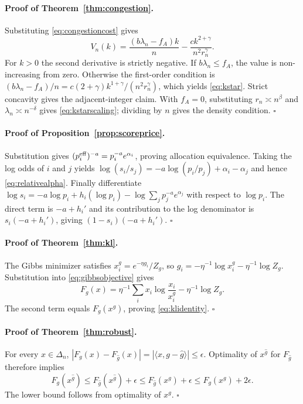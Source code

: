 \documentclass[sigconf,nonacm]{acmart}
\newcommand{\1}{\mathbf 1}
\begin{document}
\paragraph{Proof of Theorem~\ref{thm:congestion}.}
Substituting \eqref{eq:congestioncost} gives
\[
V_n(k)=\frac{(b\lambda_n-f_A)k}{n}
-\frac{c k^{2+\gamma}}{n^2r_n^\gamma}.
\]
For $k>0$ the second derivative is strictly negative.  If
$b\lambda_n\le f_A$, the value is non-increasing from zero.  Otherwise the
first-order condition is
$(b\lambda_n-f_A)/n=c(2+\gamma)k^{1+\gamma}/(n^2r_n^\gamma)$,
which yields \eqref{eq:kstar}.  Strict concavity gives the adjacent-integer
claim.  With $f_A=0$, substituting $r_n\asymp n^\beta$ and
$\lambda_n\asymp n^{-\delta}$ gives \eqref{eq:kstarscaling}; dividing by $n$
gives the density condition.
\hfill$\square$

\paragraph{Proof of Proposition~\ref{prop:scoreprice}.}
Substitution gives
$(p_i^{\rm eff})^{-a}=p_i^{-a}e^{\alpha_i}$, proving allocation
equivalence.  Taking the log odds of $i$ and $j$ yields
$\log(s_i/s_j)=-a\log(p_i/p_j)+\alpha_i-\alpha_j$ and hence
\eqref{eq:relativealpha}.  Finally differentiate
$\log s_i=-a\log p_i+h_i(\log p_i)-\log\sum_jp_j^{-a}e^{\alpha_j}$
with respect to $\log p_i$.  The direct term is $-a+h_i'$ and its contribution
to the log denominator is $s_i(-a+h_i')$, giving
$(1-s_i)(-a+h_i')$. \hfill$\square$

\paragraph{Proof of Theorem~\ref{thm:kl}.}
The Gibbs minimizer satisfies $x_i^g=e^{-\eta g_i}/Z_g$, so
$g_i=-\eta^{-1}\log x_i^g-\eta^{-1}\log Z_g$.  Substitution into
\eqref{eq:gibbsobjective} gives
\[
F_g(x)=\eta^{-1}\sum_i x_i\log\frac{x_i}{x_i^g}
-\eta^{-1}\log Z_g.
\]
The second term equals $F_g(x^g)$, proving \eqref{eq:klidentity}.
\hfill$\square$

\paragraph{Proof of Theorem~\ref{thm:robust}.}
For every $x\in\Delta_n$,
$|F_g(x)-F_{\widehat g}(x)|=|\langle x,g-\widehat g\rangle|\le\epsilon$.
Optimality of $x^{\widehat g}$ for $F_{\widehat g}$ therefore implies
\[
F_g(x^{\widehat g})\le F_{\widehat g}(x^{\widehat g})+\epsilon
\le F_{\widehat g}(x^g)+\epsilon\le F_g(x^g)+2\epsilon.
\]
The lower bound follows from optimality of $x^g$. \hfill$\square$
\end{document}
